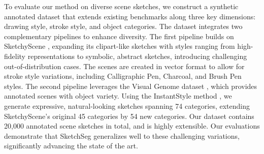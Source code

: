 To evaluate our method on diverse scene sketches, we construct a synthetic annotated dataset that extends existing benchmarks along three key dimensions: drawing style, stroke style, and object categories. The dataset integrates two complementary pipelines to enhance diversity.
The first pipeline builds on SketchyScene \cite{Zou18SketchyScene}, expanding its clipart-like sketches with styles ranging from high-fidelity representations to symbolic, abstract sketches, introducing challenging out-of-distribution cases. The scenes are created in vector format to allow for stroke style variations, including Calligraphic
Pen, Charcoal, and Brush Pen styles.
The second pipeline leverages the Visual Genome dataset \cite{VisualGenome2017}, which provides annotated scenes with object variety. Using the InstantStyle method \cite{Wang2024InstantStyleFL}, we generate expressive, natural-looking sketches spanning 74 categories, extending SketchyScene's original 45 categories by 54 new categories. Our dataset contains 20,000 annotated scene sketches in total, and is highly extensible.
Our evaluations demonstrate that SketchSeg generalizes well to these challenging variations, significantly advancing the state of the art. 









